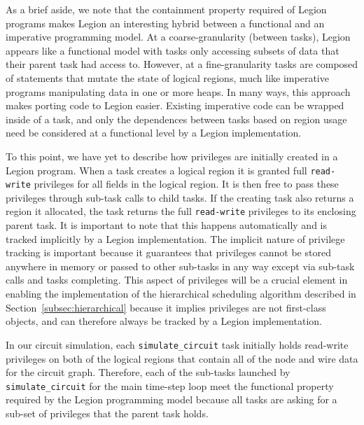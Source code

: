 As a brief aside, we note that the containment 
property required of Legion programs makes Legion
an interesting hybrid between a functional and 
an imperative programming model. At a coarse-granularity
(between tasks), Legion appears like a functional model
with tasks only accessing subsets of data that their
parent task had access to.  However, at a fine-granularity
tasks are composed of statements that mutate the state
of logical regions, much like imperative programs 
manipulating data in one or more heaps. In many ways,
this approach makes porting code to Legion easier.
Existing imperative code can be wrapped inside of a
task, and only the dependences between tasks based
on region usage need be considered at a functional
level by a Legion implementation.

To this point, we have yet to describe how privileges
are initially created in a Legion program. When a
task creates a logical region it is granted full 
{\tt read-write} privileges for all fields
in the logical region. It is then free to pass
these privileges through sub-task calls to child
tasks.  If the creating task also returns a region
it allocated, the task returns the full
{\tt read-write} privileges to its enclosing parent
task. It is important to note that this happens
automatically and is tracked implicitly by a 
Legion implementation. The implicit nature of
privilege tracking is important because it 
guarantees that privileges cannot be stored 
anywhere in memory or passed to other sub-tasks in any way
except via sub-task calls and tasks completing.
This aspect of privileges will be a crucial element 
in enabling the implementation of the hierarchical 
scheduling algorithm described in 
Section~\ref{subsec:hierarchical} because it implies
privileges are not first-class objects, and can 
therefore always be tracked by a Legion implementation.

In our circuit simulation, each {\tt simulate\_circuit}
task initially holds read-write privileges on both of
the  logical regions that contain all of the node 
and wire data for the circuit graph. Therefore, each
of the sub-tasks launched by {\tt simulate\_circuit}
for the main time-step loop meet the functional property
required by the Legion programming model because all
tasks are asking for a sub-set of privileges that the
parent task holds.

